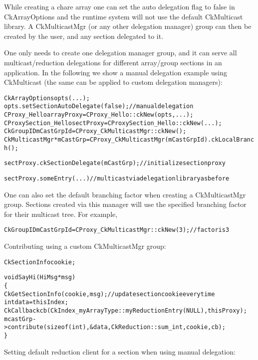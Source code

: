 While creating a chare array one can set the auto delegation flag to
false in CkArrayOptions and the runtime system will not use the default CkMulticast library.
A CkMulticastMgr (or any other delegation manager) group can then be created by the user, and any
section delegated to it.

One only needs to create one delegation manager group, and it
can serve all multicast/reduction delegations for different array/group sections in an application.
In the following we show a manual delegation example using CkMulticast (the same can be applied
to custom delegation managers):

\begin{alltt}
  CkArrayOptions opts(...);
  opts.setSectionAutoDelegate(false); // manual delegation
  CProxy_Hello arrayProxy = CProxy_Hello::ckNew(opts,...);
  CProxySection_Hello sectProxy = CProxySection_Hello::ckNew(...);
  CkGroupID mCastGrpId = CProxy_CkMulticastMgr::ckNew();
  CkMulticastMgr *mCastGrp = CProxy_CkMulticastMgr(mCastGrpId).ckLocalBranch();

  sectProxy.ckSectionDelegate(mCastGrp);  // initialize section proxy

  sectProxy.someEntry(...)           // multicast via delegation library as before

\end{alltt}

One can also set the default branching factor when creating a CkMulticastMgr group.
Sections created via this manager will use the specified branching factor for their multicast tree.
For example,

\begin{alltt}
  CkGroupID mCastGrpId = CProxy_CkMulticastMgr::ckNew(3);   // factor is 3
\end{alltt}

Contributing using a custom CkMulticastMgr group:

\begin{alltt}
  CkSectionInfo cookie;

  void SayHi(HiMsg *msg)
  \{
    CkGetSectionInfo(cookie, msg);     // update section cookie every time
    int data = thisIndex;
    CkCallback cb(CkIndex_myArrayType::myReductionEntry(NULL),thisProxy);
    mcastGrp->contribute(sizeof(int), &data, CkReduction::sum_int, cookie, cb);
  \}
\end{alltt}


Setting default reduction client for a section when using manual delegation:

